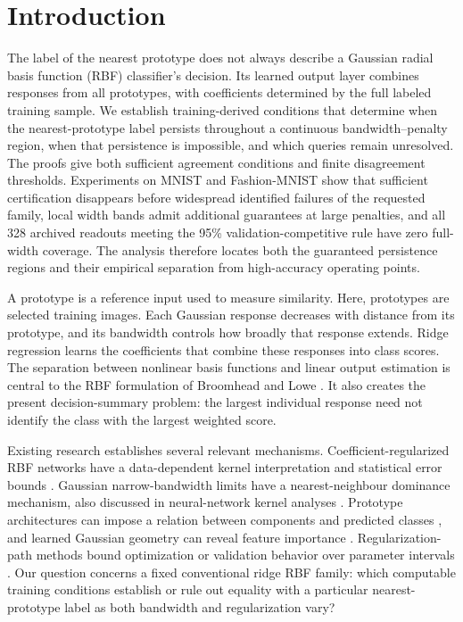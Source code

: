 \documentclass[preprint,12pt,authoryear]{elsarticle}
\begin{document}
\section{Introduction}
The label of the nearest prototype does not always describe a Gaussian radial basis function (RBF) classifier's decision. Its learned output layer combines responses from all prototypes, with coefficients determined by the full labeled training sample. We establish training-derived conditions that determine when the nearest-prototype label persists throughout a continuous bandwidth--penalty region, when that persistence is impossible, and which queries remain unresolved. The proofs give both sufficient agreement conditions and finite disagreement thresholds. Experiments on MNIST and Fashion-MNIST show that sufficient certification disappears before widespread identified failures of the requested family, local width bands admit additional guarantees at large penalties, and all 328 archived readouts meeting the 95\% validation-competitive rule have zero full-width coverage. The analysis therefore locates both the guaranteed persistence regions and their empirical separation from high-accuracy operating points.

A prototype is a reference input used to measure similarity. Here, prototypes are selected training images. Each Gaussian response decreases with distance from its prototype, and its bandwidth controls how broadly that response extends. Ridge regression learns the coefficients that combine these responses into class scores. The separation between nonlinear basis functions and linear output estimation is central to the RBF formulation of Broomhead and Lowe \citeyearpar{broomhead1988}. It also creates the present decision-summary problem: the largest individual response need not identify the class with the largest weighted score.

Existing research establishes several relevant mechanisms. Coefficient-regularized RBF networks have a data-dependent kernel interpretation and statistical error bounds \citep{que2016}. Gaussian narrow-bandwidth limits have a nearest-neighbour dominance mechanism, also discussed in neural-network kernel analyses \citep{radhakrishnan2023}. Prototype architectures can impose a relation between components and predicted classes \citep{saralajew2025}, and learned Gaussian geometry can reveal feature importance \citep{dagostino2024}. Regularization-path methods bound optimization or validation behavior over parameter intervals \citep{shibagaki2015,ndiaye2019}. Our question concerns a fixed conventional ridge RBF family: which computable training conditions establish or rule out equality with a particular nearest-prototype label as both bandwidth and regularization vary?
\end{document}
